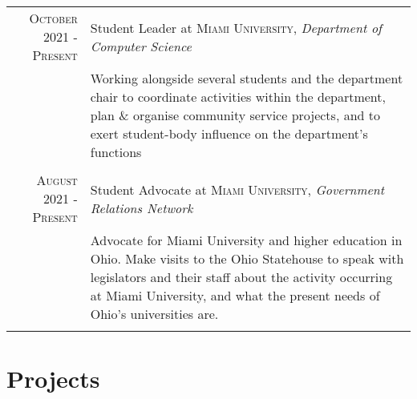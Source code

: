 \documentclass[letterpaper,8pt]{article} %
\begin{document}
{\begin{tabular}{r|p{12cm}}

\footnotesize{\textsc{October 2021 - Present}} & \footnotesize{Student Leader at \textsc{Miami University}, \emph{Department of Computer Science}}\\
& \footnotesize{Working alongside several students and the department chair to coordinate activities within the department, plan \& organise community service projects, and to exert student-body influence on the department's functions}\\
\multicolumn{2}{c}{} \\


\footnotesize{\textsc{August 2021 - Present}} & \footnotesize{Student Advocate at \textsc{Miami University}, \emph{Government Relations Network}}\\
& \footnotesize{Advocate for Miami University and higher education in Ohio. Make visits to the Ohio Statehouse to speak with legislators and their staff about the activity occurring at Miami University, and what the present needs of Ohio's universities are.}\\
\multicolumn{2}{c}{} \\
\end{tabular}}\normalsize


\section{Projects}
\end{document}
